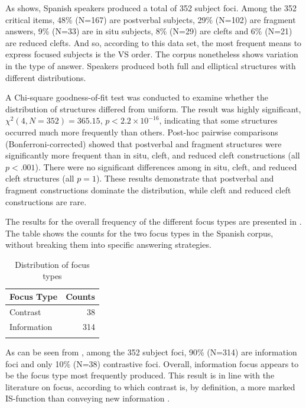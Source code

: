  As  shows, Spanish speakers produced a total of 352 subject foci. Among the 352 critical items, 48\% (N=167) are postverbal subjects, 29\%  (N=102) are fragment answers, 9\% (N=33) are in situ subjects, 8\% (N=29) are clefts and 6\% (N=21) are reduced clefts. And so, according to this data set, the most frequent means to express focused subjects is the VS order. The corpus nonetheless shows variation in the type of answer. Speakers produced both full and elliptical structures with different distributions. 
 
 A Chi-square goodness-of-fit test was conducted to examine whether the distribution of structures differed from uniform. The result was highly significant, $\chi^2(4, N=352) = 365.15$, $p < 2.2 \times 10^{-16}$, indicating that some structures occurred much more frequently than others. Post-hoc pairwise comparisons (Bonferroni-corrected) showed that postverbal and fragment structures were significantly more frequent than in situ, cleft, and reduced cleft constructions (all $p < .001$). There were no significant differences among in situ, cleft, and reduced cleft structures (all $p = 1$). These results demonstrate that postverbal and fragment constructions dominate the distribution, while cleft and reduced cleft constructions are rare.
 
 The results for the overall frequency of the different focus types are presented in . The table shows the counts for the two focus types in the Spanish corpus, without breaking them into specific answering strategies.

\begin{table} 
\centering
\begin{tabular}{lr}
  \lsptoprule
Focus Type & Counts \\ 
  \midrule
 {Contrast} &  38 \\
 {Information} & 314 \\
   \lspbottomrule
\end{tabular}
\caption{Distribution of focus types}
\label{tab:4.2}
\end{table}



As can be seen from , among the 352 subject foci, 90\% (N=314) are information foci and only 10\% (N=38) contrastive foci. Overall, information focus appears to be the focus type most frequently produced. This result is in line with the literature on focus, according to which contrast is, by definition, a more marked IS-function than conveying new information \parencite{zimmermann2008contrastive, skopeteas2010focus}. 

